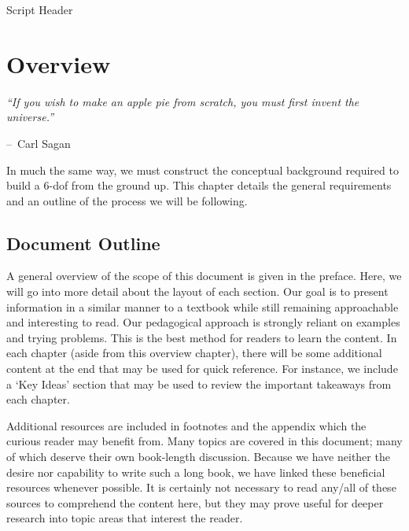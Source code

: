 \documentclass[10pt, openany, titlepage]{book}
\makeatletter
\theoremstyle{definition}
\newcounter{example}[chapter]
\newenvironment{chapquote}[2][2em]
  {\setlength{\@tempdima}{#1}%
   \def\chapquote@author{#2}%
   \parshape 1 \@tempdima \dimexpr\textwidth-2\@tempdima\relax%
   \itshape}
  {\par\normalfont\hfill--\ \chapquote@author\hspace*{\@tempdima}\par\bigskip}
\makeatother
\begin{document}
\begin{matlabscript}{Script Header}
% 
% 
% 
\end{matlabscript}

\cleardoublepage

\chapter{Overview}

\pagestyle{fancy}

\begin{chapquote}{Carl Sagan}
``If you wish to make an apple pie from scratch, you must first invent the universe.''
\end{chapquote}

In much the same way, we must construct the conceptual background required to build a 6-\gls{dof} from the ground up. This chapter details the general requirements and an outline of the process we will be following.

\section{Document Outline}
A general overview of the scope of this document is given in the preface.  Here, we will go into more detail about the layout of each section. Our goal is to present information in a similar manner to a textbook while still remaining approachable and interesting to read. Our pedagogical approach is strongly reliant on examples and trying problems. This is the best method for readers to learn the content. In each chapter (aside from this overview chapter), there will be some additional content at the end that may be used for quick reference. For instance, we include a `Key Ideas' section that may be used to review the important takeaways from each chapter.

Additional resources are included in footnotes and the appendix which the curious reader may benefit from. Many topics are covered in this document; many of which deserve their own book-length discussion. Because we have neither the desire nor capability to write such a long book, we have linked these beneficial resources whenever possible. It is certainly not necessary to read any/all of these sources to comprehend the content here, but they may prove useful for deeper research into topic areas that interest the reader.
\end{document}
